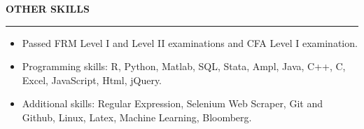 \documentclass[a4paper,12pt]{report}
\begin{document}
\noindent 
\textbf{OTHER SKILLS} \par
\vspace{2pt}
\hrule
\vspace{6pt}
\noindent 
\begin{itemize}[noitemsep,topsep=0pt]
\item {\fontsize{10pt}{10pt}\selectfont Passed FRM Level I and Level II examinations and CFA Level I examination.} \par
\noindent 
\item {\fontsize{10pt}{10pt}\selectfont Programming skills: R, Python, Matlab, SQL, Stata, Ampl, Java, C++, C, Excel, JavaScript, Html, jQuery. } \par
\noindent 
\item {\fontsize{10pt}{10pt}\selectfont Additional skills: Regular Expression, Selenium Web Scraper, Git and Github, Linux, Latex, Machine Learning, Bloomberg.}\end{itemize}
 \par
\end{document}
